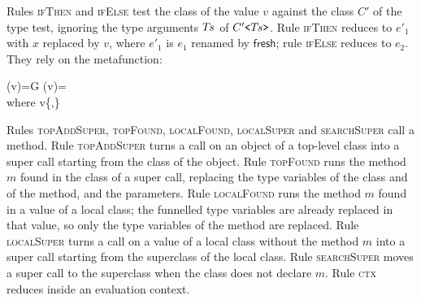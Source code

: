 Rules \textsc{ifThen} and \textsc{ifElse} test the class of the value $v$ against the class $C'$ of the type test, ignoring the type arguments $T\mkern-2mu s$ of $C'\text{\ttfamily <}T\mkern-2mu s\text{\ttfamily >}$.
Rule \textsc{ifThen} reduces to $e'_1$ with $x$ replaced by $v$, where $e'_1$ is $e_1$ renamed by $\mathsf{fresh}$; rule \textsc{ifElse} reduces to $e_2$.
They rely on the metafunction:
{\small
\begin{Define}{(v)=G}
(v)=\\
\quad\textrm{where }v\in\{,\}
\end{Define}
}

Rules \textsc{topAddSuper}, \textsc{topFound}, \textsc{localFound}, \textsc{localSuper} and \textsc{searchSuper} call a method.
Rule \textsc{topAddSuper} turns a call on an object of a top-level class into a super call starting from the class of the object.
Rule \textsc{topFound} runs the method $m$ found in the class of a super call, replacing the type variables of the class and of the method, \Q@this@ and the parameters.
Rule \textsc{localFound} runs the method $m$ found in a value of a local class; the funnelled type variables are already replaced in that value, so only the type variables of the method are replaced.
Rule \textsc{localSuper} turns a call on a value of a local class without the method $m$ into a super call starting from the superclass of the local class.
Rule \textsc{searchSuper} moves a super call to the superclass when the class does not declare $m$.
Rule \textsc{ctx} reduces inside an evaluation context.

